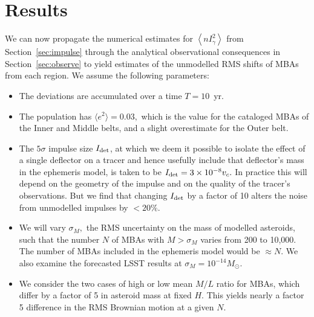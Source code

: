 \documentclass[linenumbers, onecolumn]{aastex631}
\newcommand\edited[1]{{\color{red} {#1}}}
\begin{document}
\section{Results}
\label{sec:results}
We can now propagate the numerical estimates for $\left\langle nI_\gamma^2\right\rangle$ from Section~\ref{sec:impulse} through the analytical observational consequences in Section~\ref{sec:observe} to yield estimates of the unmodelled RMS shifts of MBAs from each region.  We assume the following parameters:
\begin{itemize}
\item The deviations are accumulated over a time $T=10$~yr.
\item The population has $\langle e^2 \rangle=0.03,$ which is the value for the cataloged MBAs of the Inner and Middle belts, and a slight overestimate for the Outer belt.
\item The $5\sigma$ impulse size $I_{\rm det}$, at which we deem it possible to isolate the effect of a single deflector on a tracer and hence usefully include that deflector's mass in the ephemeris model, is taken to be $I_{\rm det} = 3\times10^{-8}v_c.$ In practice this will depend on the geometry of the impulse and on the quality of the tracer's observations.  But we find that changing $I_{\rm det}$ by a factor of 10 alters the noise from unmodelled impulses by $<20\%.$
\item We will vary $\sigma_M,$ the RMS uncertainty on the mass of modelled asteroids, such that the number $N$ of MBAs  with $M>\sigma_M$ varies from 200 to 10,000.  The number of MBAs included in the ephemeris model would be $\approx N.$  \edited{We also examine the forecasted LSST results at $\sigma_M=10^{-14}M_\odot.$}
  \item \edited{We consider the two cases of high or low mean $M/L$ ratio for
      MBAs, which differ by a factor of 5 in asteroid mass at fixed $H.$ This
      yields nearly a factor 5 difference in the RMS Brownian motion at a given $N.$}
\end{itemize}
\end{document}
